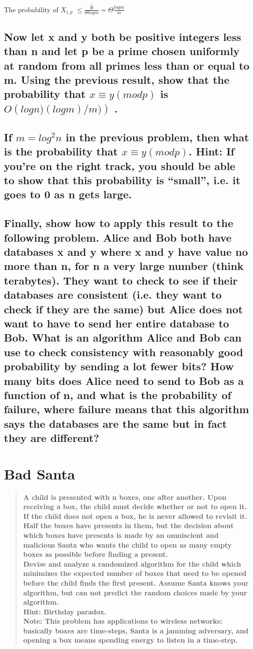 \documentclass[titlepage]{article}\usepackage[]{graphicx}\usepackage[]{color}
\begin{document}
The probability of $X_{i,p}$ $\leq \frac{\frac{1}{m}}{\Theta log m} = \Theta
\frac{log m}{m} $


\subsection{ Now let x and y both be positive integers less than n and let p be a prime
chosen uniformly at random from all primes less than or equal to m. Using the
previous result, show that the probability that $ x ≡ y (mod p)$  is $ O\left( log
n)(log m)/m)\right)$ . }

\subsection{ If $ m = log^2 n$  in the previous problem, then what is the probability that
$x ≡ y (mod p)$. Hint: If you're on the right track, you should be able to show
that this probability is ``small'', i.e. it goes to 0 as n gets large. }

\subsection{ Finally, show how to apply this result to the following problem. Alice and
Bob both have databases x and y where x and y have value no more than n, for n
a very large number (think terabytes). They want to check to see if their
databases are consistent (i.e. they want to check if they are the same) but
Alice does not want to have to send her entire database to Bob. What is an
algorithm Alice and Bob can use to check consistency with reasonably good
probability by sending a lot fewer bits? How many bits does Alice need to send
to Bob as a function of n, and what is the probability of failure, where
failure means that this algorithm says the databases are the same but in fact
they are different? }


\section{Bad Santa }
\begin{quote}
	\textbf{
		A child is presented with n boxes, one after another. Upon receiving
		a box, the child must decide whether or not to open it. If the child does not
		open a box, he is never allowed to revisit it. Half the
		boxes have presents in them, but the decision about which boxes have presents
		is made by an omniscient and malicious Santa who wants the child to open as
		many empty boxes as possible before finding a present. \\ 
		Devise and analyze a randomized algorithm for the child which minimizes the
		expected number of boxes that need to be opened before the child finds the
		first present. Assume Santa knows your algorithm, but can not predict the
		random choices made by your algorithm. \\ 
		Hint: Birthday paradox. \\
		Note: This problem has applications to wireless networks: basically boxes are
		time-steps, Santa is a jamming adversary, and opening a box means spending
	energy to listen in a time-step.}
\end{quote}
\end{document}
